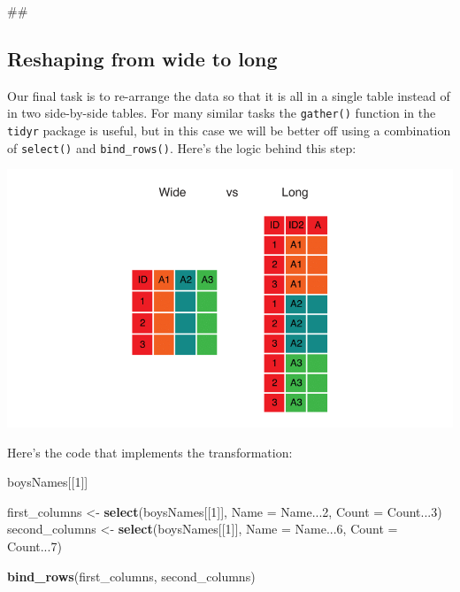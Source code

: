 \documentclass[]{book}
\newenvironment{Shaded}{\begin{snugshade}}{\end{snugshade}}
\newcommand{\KeywordTok}[1]{\textcolor[rgb]{0.13,0.29,0.53}{\textbf{#1}}}
\newcommand{\DataTypeTok}[1]{\textcolor[rgb]{0.13,0.29,0.53}{#1}}
\newcommand{\DecValTok}[1]{\textcolor[rgb]{0.00,0.00,0.81}{#1}}
\newcommand{\StringTok}[1]{\textcolor[rgb]{0.31,0.60,0.02}{#1}}
\newcommand{\NormalTok}[1]{#1}
\begin{document}
\begin{Shaded}
\begin{Highlighting}[]
\NormalTok{## }
\end{Highlighting}
\end{Shaded}

\subsection{Reshaping from wide to
long}\label{reshaping-from-wide-to-long}

Our final task is to re-arrange the data so that it is all in a single
table instead of in two side-by-side tables. For many similar tasks the
\texttt{gather()} function in the \texttt{tidyr} package is useful, but
in this case we will be better off using a combination of
\texttt{select()} and \texttt{bind\_rows()}. Here's the logic behind
this step:

\includegraphics{R/RDataWrangling/images/wide_vs_long.png}

Here's the code that implements the transformation:

\begin{Shaded}
\begin{Highlighting}[]
\NormalTok{boysNames[[}\DecValTok{1}\NormalTok{]]}

\NormalTok{first_columns <-}\StringTok{ }\KeywordTok{select}\NormalTok{(boysNames[[}\DecValTok{1}\NormalTok{]], }\DataTypeTok{Name =}\NormalTok{ Name...}\DecValTok{2}\NormalTok{, }\DataTypeTok{Count =}\NormalTok{ Count...}\DecValTok{3}\NormalTok{)}
\NormalTok{second_columns <-}\StringTok{ }\KeywordTok{select}\NormalTok{(boysNames[[}\DecValTok{1}\NormalTok{]], }\DataTypeTok{Name =}\NormalTok{ Name...}\DecValTok{6}\NormalTok{, }\DataTypeTok{Count =}\NormalTok{ Count...}\DecValTok{7}\NormalTok{)}

\KeywordTok{bind_rows}\NormalTok{(first_columns, second_columns)}
\end{Highlighting}
\end{Shaded}
\end{document}
